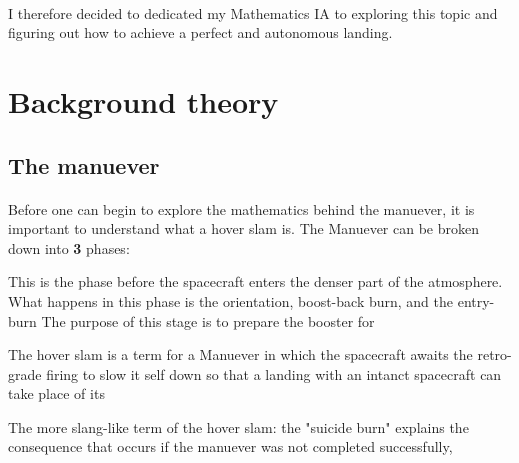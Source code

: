 \documentclass[12pt]{article}
\begin{document}
    \paragraph{\noindent}
        I therefore decided to dedicated my Mathematics IA to exploring this topic and figuring out how to achieve a perfect and autonomous landing.

    

    \section{Background theory}
        \subsection{The manuever}
        \paragraph{}
        Before one can begin to explore the mathematics behind the manuever, it is important to understand what a hover slam is.
        The Manuever can be broken down into \textbf{3} phases: 
            



    This is the phase before the spacecraft enters the denser part of the atmosphere. What happens in this phase is the orientation, boost-back burn, and the entry-burn
    The purpose of this stage is to prepare the booster for 
    

    The hover slam is a term for a Manuever in which the spacecraft awaits the retro-grade firing to slow it self down so that a landing with an intanct spacecraft can take place of its 

    The more slang-like term of the hover slam: the "suicide burn" explains the consequence that occurs if the manuever was not completed successfully,
    

    
\end{document}
